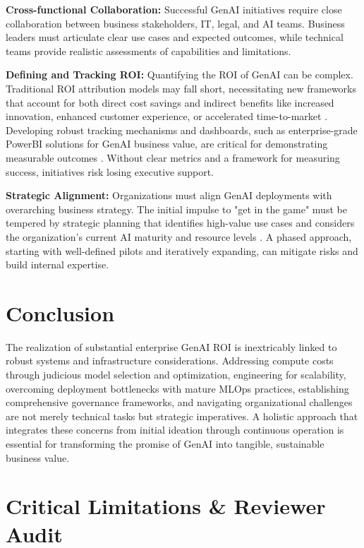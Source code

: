 \documentclass[10pt,journal,compsoc,twocolumn]{IEEEtran}
\begin{document}
\textbf{Cross-functional Collaboration:} Successful GenAI initiatives require close collaboration between business stakeholders, IT, legal, and AI teams. Business leaders must articulate clear use cases and expected outcomes, while technical teams provide realistic assessments of capabilities and limitations.

\textbf{Defining and Tracking ROI:} Quantifying the ROI of GenAI can be complex. Traditional ROI attribution models may fall short, necessitating new frameworks that account for both direct cost savings and indirect benefits like increased innovation, enhanced customer experience, or accelerated time-to-market \cite{crossref_10_2139_ssrn_6374778}. Developing robust tracking mechanisms and dashboards, such as enterprise-grade PowerBI solutions for GenAI business value, are critical for demonstrating measurable outcomes \cite{github_ankitakapoor980_genai_roi_powerbi_dashboard}. Without clear metrics and a framework for measuring success, initiatives risk losing executive support.

\textbf{Strategic Alignment:} Organizations must align GenAI deployments with overarching business strategy. The initial impulse to "get in the game" must be tempered by strategic planning that identifies high-value use cases and considers the organization's current AI maturity and resource levels \cite{openalex_w4400993506}. A phased approach, starting with well-defined pilots and iteratively expanding, can mitigate risks and build internal expertise.


\section{Conclusion}


The realization of substantial enterprise GenAI ROI is inextricably linked to robust systems and infrastructure considerations. Addressing compute costs through judicious model selection and optimization, engineering for scalability, overcoming deployment bottlenecks with mature MLOps practices, establishing comprehensive governance frameworks, and navigating organizational challenges are not merely technical tasks but strategic imperatives. A holistic approach that integrates these concerns from initial ideation through continuous operation is essential for transforming the promise of GenAI into tangible, sustainable business value.






\section{Critical Limitations \& Reviewer Audit}
\end{document}
